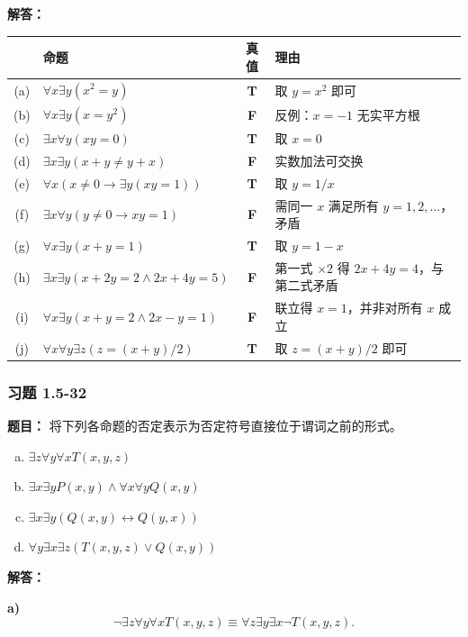 \documentclass[11pt,UTF8]{article}
\begin{document}
\textbf{解答：}
\begin{center}
\begin{tabular}{c|l|c|l}
\hline
 & 命题 & 真值 & 理由 \\
\hline
(a) & $\forall x \exists y (x^2 = y)$ & \textbf{T} & 取 $y = x^2$ 即可 \\
(b) & $\forall x \exists y (x = y^2)$ & \textbf{F} & 反例：$x = -1$ 无实平方根 \\
(c) & $\exists x \forall y (xy = 0)$ & \textbf{T} & 取 $x = 0$ \\
(d) & $\exists x \exists y (x + y \neq y + x)$ & \textbf{F} & 实数加法可交换 \\
(e) & $\forall x (x \neq 0 \to \exists y (xy = 1))$ & \textbf{T} & 取 $y = 1/x$ \\
(f) & $\exists x \forall y (y \neq 0 \to xy = 1)$ & \textbf{F} & 需同一 $x$ 满足所有 $y=1,2,\dots$，矛盾 \\
(g) & $\forall x \exists y (x + y = 1)$ & \textbf{T} & 取 $y = 1 - x$ \\
(h) & $\exists x \exists y (x + 2y = 2 \land 2x + 4y = 5)$ & \textbf{F} & 第一式 $\times 2$ 得 $2x+4y=4$，与第二式矛盾 \\
(i) & $\forall x \exists y (x + y = 2 \land 2x - y = 1)$ & \textbf{F} & 联立得 $x=1$，并非对所有 $x$ 成立 \\
(j) & $\forall x \forall y \exists z (z = (x + y)/2)$ & \textbf{T} & 取 $z = (x+y)/2$ 即可 \\
\hline
\end{tabular}
\end{center}

\subsubsection*{习题 1.5-32}
\textbf{题目：} 将下列各命题的否定表示为否定符号直接位于谓词之前的形式。
\begin{enumerate}[a)]
    \item $\exists z \forall y \forall x T(x,y,z)$
    \item $\exists x \exists y P(x,y) \land \forall x \forall y Q(x,y)$
    \item $\exists x \exists y (Q(x,y) \leftrightarrow Q(y,x))$
    \item $\forall y \exists x \exists z (T(x,y,z) \lor Q(x,y))$
\end{enumerate}

\textbf{解答：}

\textbf{a)}
\[ \neg \exists z \forall y \forall x T(x,y,z) \equiv \forall z \exists y \exists x \neg T(x,y,z). \]
\end{document}
